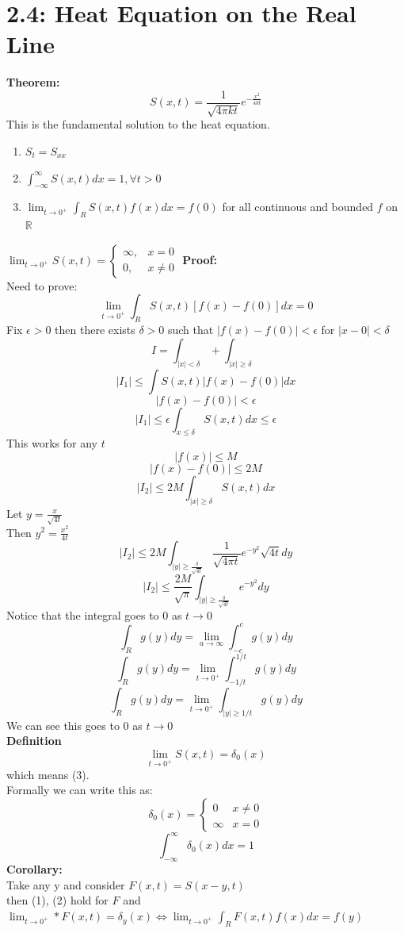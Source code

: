 \documentclass{article}
\begin{document}
\section*{2.4: Heat Equation on the Real Line}
\textbf{Theorem:} \\
$$S(x,t) = \frac{1}{\sqrt{4\pi kt}} e^{-\frac{x^2}{4kt}}$$
This is the fundamental solution to the heat equation.\\
\begin{enumerate}
    \item $S_t =  S_{xx}$
    \item $\int_{-\infty}^{\infty} S(x,t) dx = 1, \forall t > 0$
    \item $\lim_{t \to 0^+} \int_{R} S(x,t) f(x) dx = f(0)$ for all continuous and bounded $f$ on $\mathds{R}$
\end{enumerate}
$\lim_{t \to 0^+} S(x,t) = \begin{cases}
        \infty, & x = 0\\
        0, & x \neq 0
\end{cases}$
\textbf{Proof:} \\
Need to prove:\\
$$ \lim_{t \rightarrow 0^+}\int_R S(x,t) [f(x) - f(0)] dx = 0$$
Fix $\epsilon > 0$ then there exists $\delta > 0$ such that $|f(x) - f(0)| < \epsilon$ for $|x-0| < \delta$\\
$$ I = \int_{|x| < \delta} + \int_{|x| \geq \delta}$$
$$ |I_1| \leq \int S(x,t) |f(x) - f(0)| dx$$
$$ |f(x) - f(0)| < \epsilon$$
$$ |I_1| \leq \epsilon \int_{x \leq \delta} S(x,t) dx \leq \epsilon $$
This works for any $t$\\
$$ |f(x)| \leq M $$
$$ |f(x) - f(0)| \leq 2M$$
$$ |I_2| \leq 2M \int_{|x| \geq \delta} S(x,t) dx$$
Let $y = \frac{x}{\sqrt{4t}}$\\
Then $y^2 = \frac{x^2}{4t}$\\
$$ |I_2| \leq 2M \int_{|y| \geq \frac{\delta}{\sqrt{4t}}} \frac{1}{\sqrt{4\pi t}} e^{-y^2} \sqrt{4t} dy$$
$$ |I_2| \leq \frac{2M}{\sqrt{\pi}}\int_{|y| \geq \frac{\delta}{\sqrt{4t}}} e^{-y^2} dy$$
Notice that the integral goes to 0 as $t \to 0$\\
$$ \int_{R} g(y) dy = \lim_{a \rightarrow \infty}\int_{-c}^{c} g(y) dy$$
$$ \int_{R} g(y) dy = \lim_{t \rightarrow 0^+} \int_{-1/t}^{1/t} g(y) dy$$
$$ \int_{R} g(y) dy = \lim_{t \rightarrow 0^+} \int_{|y| \geq 1/t} g(y) dy$$
We can see this goes to 0 as $t \to 0$\\
\textbf{Definition} \\
$$\lim_{t \to 0^+} S(x,t) = \delta_0(x)$$
which means (3).\\
Formally we can write this as:
$$ \delta_0(x) = \begin{cases}
    0 & x \neq 0\\
    \infty & x = 0
\end{cases}$$
$$ \int_{-\infty}^{\infty} \delta_0(x) dx = 1$$
\textbf{Corollary:} \\
Take any y and consider $F(x,t) = S(x-y,t)$\\
then (1), (2) hold for $F$ and \\
$\lim_{t \to 0^+}*F(x,t) = \delta_y(x) \iff \lim_{t \to 0^+} \int_R F(x,t) f(x) dx = f(y)$\\ 
\end{document}
